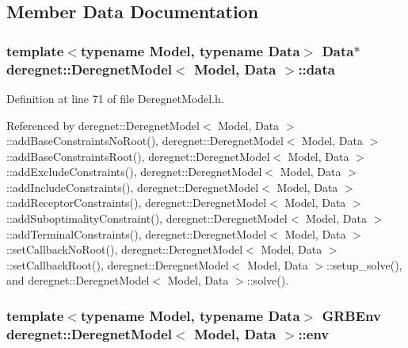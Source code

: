 \subsection{Member Data Documentation}
\subsubsection[{\texorpdfstring{data}{data}}]{\setlength{\rightskip}{0pt plus 5cm}template$<$typename Model, typename Data$>$ {\bf Data}$\ast$ {\bf deregnet\+::\+Deregnet\+Model}$<$ Model, {\bf Data} $>$\+::data\hspace{0.3cm}{\ttfamily [protected]}}\hypertarget{classderegnet_1_1DeregnetModel_ad5399761cf6293a702f3800bda4806d1}{}\label{classderegnet_1_1DeregnetModel_ad5399761cf6293a702f3800bda4806d1}


Definition at line 71 of file Deregnet\+Model.\+h.



Referenced by deregnet\+::\+Deregnet\+Model$<$ Model, Data $>$\+::add\+Base\+Constraints\+No\+Root(), deregnet\+::\+Deregnet\+Model$<$ Model, Data $>$\+::add\+Base\+Constraints\+Root(), deregnet\+::\+Deregnet\+Model$<$ Model, Data $>$\+::add\+Exclude\+Constraints(), deregnet\+::\+Deregnet\+Model$<$ Model, Data $>$\+::add\+Include\+Constraints(), deregnet\+::\+Deregnet\+Model$<$ Model, Data $>$\+::add\+Receptor\+Constraints(), deregnet\+::\+Deregnet\+Model$<$ Model, Data $>$\+::add\+Suboptimality\+Constraint(), deregnet\+::\+Deregnet\+Model$<$ Model, Data $>$\+::add\+Terminal\+Constraints(), deregnet\+::\+Deregnet\+Model$<$ Model, Data $>$\+::set\+Callback\+No\+Root(), deregnet\+::\+Deregnet\+Model$<$ Model, Data $>$\+::set\+Callback\+Root(), deregnet\+::\+Deregnet\+Model$<$ Model, Data $>$\+::setup\+\_\+solve(), and deregnet\+::\+Deregnet\+Model$<$ Model, Data $>$\+::solve().

\subsubsection[{\texorpdfstring{env}{env}}]{\setlength{\rightskip}{0pt plus 5cm}template$<$typename Model, typename Data$>$ G\+R\+B\+Env {\bf deregnet\+::\+Deregnet\+Model}$<$ Model, {\bf Data} $>$\+::env\hspace{0.3cm}{\ttfamily [protected]}}\hypertarget{classderegnet_1_1DeregnetModel_accd03120356b80b083041b4eef003e5b}{}\label{classderegnet_1_1DeregnetModel_accd03120356b80b083041b4eef003e5b}


